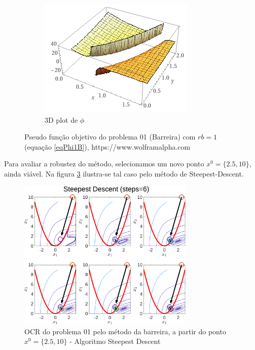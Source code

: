 \documentclass[10pt, a4paper]{article}
\begin{document}
\begin{figure}[H]
\begin{subfigure}{0.45\textwidth}
            \includegraphics[width=\textwidth]{wolf_3d.PNG}
            \caption{3D plot de $\phi$}
            \label{fig:wolf_3d}
      \end{subfigure}
      \caption{Pseudo fun\c c\~ao objetivo do problema 01 (Barreira) com $rb=1$ (equa\c c\~ao \ref{eqPhi1B}), https://www.wolframalpha.com}
      \label{fig:wolf}
\end{figure}

Para avaliar a robustez do m\'etodo, selecionamos um novo ponto $x^0=\{2.5,10\}$, ainda vi\'avel. Na figura \ref{fig:fig04} ilustra-se tal caso pelo m\'etodo de Steepest-Descent.

\begin{figure}[H]
      \centering
      \includegraphics[width=0.75\textwidth]{fig04_P01_BAR_X2_SD.png}
      \caption{OCR do problema 01 pelo m\'etodo da barreira, a partir do ponto $x^0=\{2.5,10\}$ - Algoritmo Steepest Descent}
      \label{fig:fig04}
\end{figure}
\end{document}
